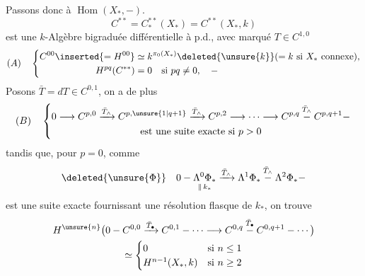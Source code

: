 Passons donc à $\operatorname{Hom}(X_*,-)$.
\[
C^{**}=C_*^{**}(X_*)=C^{**}(X_*,k)
\]
est une $k$-Algèbre bigraduée différentielle à p.d., avec  marqué $T\in C^{1,0}$
\[
(A)\quad
\left\{\begin{aligned}
C^{00}\inserted{=H^{00}}&\simeq k^{\pi_0(X_*)}\deleted{\unsure{k}}(=k\text{ si }X_*\text{ connexe}),\\
H^{pq}(C^{**})&=0\quad\text{si }pq\ne0,\quad -
\end{aligned}\right.
\]
Posons $\bar T=dT\in C^{0,1}$, on a de plus
\[
(B)\quad\left\{\begin{gathered}
0\longrightarrow C^{p,0}\xrightarrow{\bar T_\wedge}C^{p,\unsure{1|q+1}}
\xrightarrow{\bar T_\wedge}C^{p,2}\longrightarrow\cdots
\longrightarrow C^{p,q}\overset{\bar T_\wedge}{-}C^{p,q+1}-\\
\text{est une suite exacte si }p>0
\end{gathered}\right.
\]
tandis que, pour $p=0$, comme
\[
\deleted{\unsure{\Phi}}\quad
0-\underset{\Vert\,k_*}{\Lambda^0\Phi_*}
\xrightarrow{\bar T_\wedge}\Lambda^1\Phi_*
\overset{\bar T_\wedge}{-}\Lambda^2\Phi_*-
\]
est une suite exacte fournissant une résolution flasque de $k_*$, on trouve
\[
\begin{gathered}
H^{\unsure{n}}\bigl(0-C^{0,0}\xrightarrow{\bar T_\bullet}C^{0,1}
-\cdots\longrightarrow C^{0,q}\overset{\bar T_\bullet}{-}C^{0,q+1}-\cdots\bigr)\\
\simeq\begin{cases}
0&\text{si }n\leq1\\
H^{n-1}(X_*,k)&\text{si }n\geq2
\end{cases}
\end{gathered}
\]

